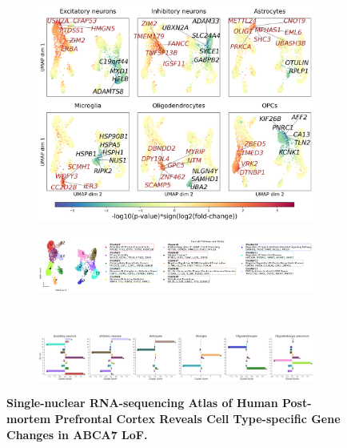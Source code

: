 \begin{figure}[ht]
\begin{subfigure}[t]{.5\textwidth}
\begin{subfigure}[t]{.5\textwidth}
        \end{subfigure}
    \\[-3ex] 
    \end{subfigure}
    \begin{subfigure}[t]{0.5\textwidth}
        \caption{}
        \includegraphics[width=\textwidth]{./main_plots/umap_projection_top_genes.png}        
    \end{subfigure}
    \begin{subfigure}[t]{\textwidth}
        \caption{}
        \includegraphics[width=\textwidth]{./main_plots/clusters_umap.png}        
    \end{subfigure}
    \\[-2ex] 
    \begin{subfigure}[t]{\textwidth}
        \caption{}
        \includegraphics[width=\textwidth]{./main_plots/clusters_bars.png}        
    \end{subfigure}
    \caption{
        \textbf{Single-nuclear RNA-sequencing Atlas of Human Post-mortem Prefrontal Cortex Reveals Cell Type-specific Gene Changes in ABCA7 LoF.}\\[1ex]
}
\end{figure}
